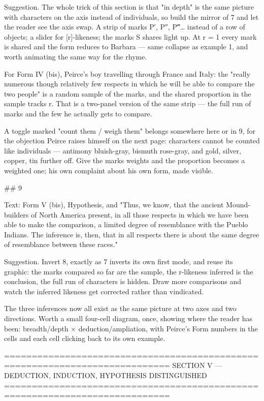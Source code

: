 Suggestion. The whole trick of this section is that "in depth" is the same
picture with characters on the axis instead of individuals, so build the mirror
of 7 and let the reader see the axis swap. A strip of marks P′, P″, P‴… instead
of a row of objects; a slider for [r]-likeness; the marks S shares light up.
At r = 1 every mark is shared and the form reduces to Barbara — same collapse as
example 1, and worth animating the same way for the rhyme.

For Form IV (bis), Peirce's boy travelling through France and Italy: the "really
numerous though relatively few respects in which he will be able to compare the
two people" is a random sample of the marks, and the shared proportion in the
sample tracks r. That is a two-panel version of the same strip — the full run of
marks and the few he actually gets to compare.

A toggle marked "count them / weigh them" belongs somewhere here or in 9, for
the objection Peirce raises himself on the next page: characters cannot be
counted like individuals — antimony bluish-gray, bismuth rose-gray, and gold,
silver, copper, tin further off. Give the marks weights and the proportion
becomes a weighted one; his own complaint about his own form, made visible.


## 9

Text: Form V (bis), Hypothesis, and "Thus, we know, that the ancient
Mound-builders of North America present, in all those respects in which we have
been able to make the comparison, a limited degree of resemblance with the
Pueblo Indians. The inference is, then, that in all respects there is about the
same degree of resemblance between these races."

Suggestion. Invert 8, exactly as 7 inverts its own first mode, and reuse its
graphic: the marks compared so far are the sample, the r-likeness inferred is
the conclusion, the full run of characters is hidden. Draw more comparisons and
watch the inferred likeness get corrected rather than vindicated.

The three inferences now all exist as the same picture at two axes and two
directions. Worth a small four-cell diagram, once, showing where the reader has
been: breadth/depth × deduction/ampliation, with Peirce's Form numbers in the
cells and each cell clicking back to its own example.


============================================================================
SECTION V — DEDUCTION, INDUCTION, HYPOTHESIS DISTINGUISHED
============================================================================

